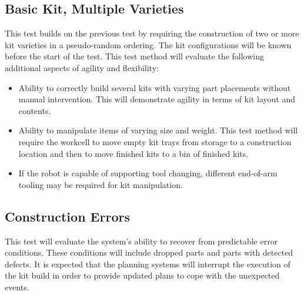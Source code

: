 \subsection{Basic Kit, Multiple Varieties}
This test builds on the previous test by requiring the construction of two or more kit varieties in a pseudo-random ordering.
The kit configurations will be known before the start of the test. 
This test method will evaluate the following additional aspects of agility and flexibility:
\begin{itemize}
	\item Ability to correctly build several kits with varying part placements without manual intervention.
	This will demonstrate agility in terms of kit layout and contents.
	\item Ability to manipulate items of varying size and weight. This test method will require the workcell
	to move empty kit trays from storage to a construction location and then to move finished kits to
	a bin of finished kits.
	\item If the robot is capable of supporting tool changing, different end-of-arm tooling may be required for 
	kit manipulation. 
\end{itemize}

\subsection{Construction Errors}
This test will evaluate the system's ability to recover from predictable error conditions. These conditions will include
dropped parts and parts with detected defects. It is expected that the planning systems will interrupt the
execution of the kit build in order to provide updated plans to cope with the unexpected events.